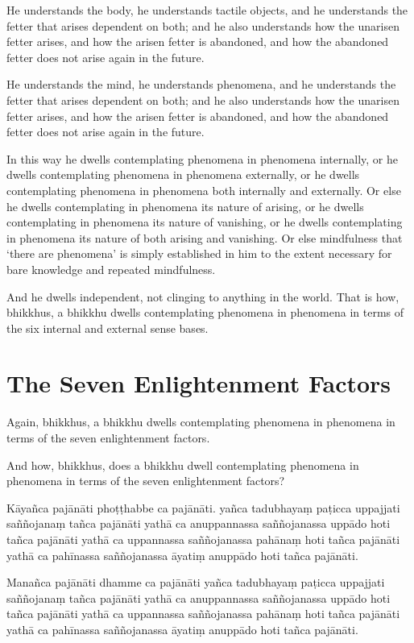 \englishPage

He understands the body, he understands tactile objects, and he understands the
fetter that arises dependent on both; and he also understands how the unarisen
fetter arises, and how the arisen fetter is abandoned, and how the abandoned
fetter does not arise again in the future.

He understands the mind, he understands phenomena, and he understands the fetter
that arises dependent on both; and he also understands how the unarisen fetter
arises, and how the arisen fetter is abandoned, and how the abandoned fetter
does not arise again in the future.

In this way he dwells contemplating phenomena in phenomena internally, or he
dwells contemplating phenomena in phenomena externally, or he dwells
contemplating phenomena in phenomena both internally and externally. Or else he
dwells contemplating in phenomena its nature of arising, or he dwells
contemplating in phenomena its nature of vanishing, or he dwells contemplating
in phenomena its nature of both arising and vanishing. Or else mindfulness that
‘there are phenomena’ is simply established in him to the extent necessary for
bare knowledge and repeated mindfulness.

And he dwells independent, not clinging to anything in the world. That is how,
bhikkhus, a bhikkhu dwells contemplating phenomena in phenomena in terms of the
six internal and external sense bases.


\section{The Seven Enlightenment Factors}

Again, bhikkhus, a bhikkhu dwells contemplating phenomena in phenomena in terms
of the seven enlightenment factors.

And how, bhikkhus, does a bhikkhu dwell contemplating phenomena in phenomena in
terms of the seven enlightenment factors?

\paliPage

Kāyañca pajānāti phoṭṭhabbe ca pajānāti. yañca tadubhayaṃ paṭicca uppajjati
saññojanaṃ tañca pajānāti yathā ca anuppannassa saññojanassa uppādo hoti tañca
pajānāti yathā ca uppannassa saññojanassa pahānaṃ hoti tañca pajānāti yathā ca
pahīnassa saññojanassa āyatiṃ anuppādo hoti tañca pajānāti.

Manañca pajānāti dhamme ca pajānāti yañca tadubhayaṃ paṭicca uppajjati
saññojanaṃ tañca pajānāti yathā ca anuppannassa saññojanassa uppādo hoti tañca
pajānāti yathā ca uppannassa saññojanassa pahānaṃ hoti tañca pajānāti yathā ca
pahīnassa saññojanassa āyatiṃ anuppādo hoti tañca pajānāti.

